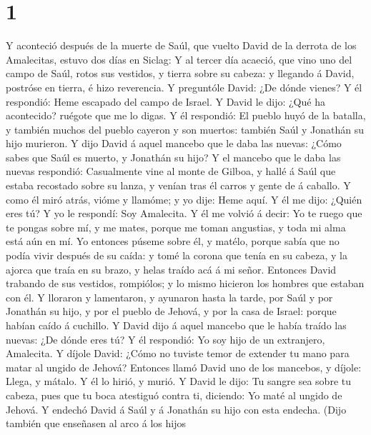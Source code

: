\hypertarget{section}{%
\section{1}\label{section}}

 Y aconteció después de la muerte de Saúl, que vuelto David
de la derrota de los Amalecitas, estuvo dos días en Siclag: 
Y al tercer día acaeció, que vino uno del campo de Saúl, rotos sus
vestidos, y tierra sobre su cabeza: y llegando á David, postróse en
tierra, é hizo reverencia.  Y preguntóle David: ¿De dónde
vienes? Y él respondió: Heme escapado del campo de Israel. 
Y David le dijo: ¿Qué ha acontecido? ruégote que me lo digas. Y él
respondió: El pueblo huyó de la batalla, y también muchos del pueblo
cayeron y son muertos: también Saúl y Jonathán su hijo murieron.
 Y dijo David á aquel mancebo que le daba las nuevas: ¿Cómo
sabes que Saúl es muerto, y Jonathán su hijo?  Y el mancebo
que le daba las nuevas respondió: Casualmente vine al monte de Gilboa, y
hallé á Saúl que estaba recostado sobre su lanza, y venían tras él
carros y gente de á caballo.  Y como él miró atrás, vióme y
llamóme; y yo dije: Heme aquí.  Y él me dijo: ¿Quién eres
tú? Y yo le respondí: Soy Amalecita.  Y él me volvió á
decir: Yo te ruego que te pongas sobre mí, y me mates, porque me toman
angustias, y toda mi alma está aún en mí.  Yo entonces
púseme sobre él, y matélo, porque sabía que no podía vivir después de su
caída: y tomé la corona que tenía en su cabeza, y la ajorca que traía en
su brazo, y helas traído acá á mi señor.  Entonces David
trabando de sus vestidos, rompiólos; y lo mismo hicieron los hombres que
estaban con él.  Y lloraron y lamentaron, y ayunaron hasta
la tarde, por Saúl y por Jonathán su hijo, y por el pueblo de Jehová, y
por la casa de Israel: porque habían caído á cuchillo.  Y
David dijo á aquel mancebo que le había traído las nuevas: ¿De dónde
eres tú? Y él respondió: Yo soy hijo de un extranjero, Amalecita.
 Y díjole David: ¿Cómo no tuviste temor de extender tu mano
para matar al ungido de Jehová?  Entonces llamó David uno
de los mancebos, y díjole: Llega, y mátalo. Y él lo hirió, y murió.
 Y David le dijo: Tu sangre sea sobre tu cabeza, pues que
tu boca atestiguó contra ti, diciendo: Yo maté al ungido de Jehová.
 Y endechó David á Saúl y á Jonathán su hijo con esta
endecha.  (Dijo también que enseñasen al arco á los hijos
